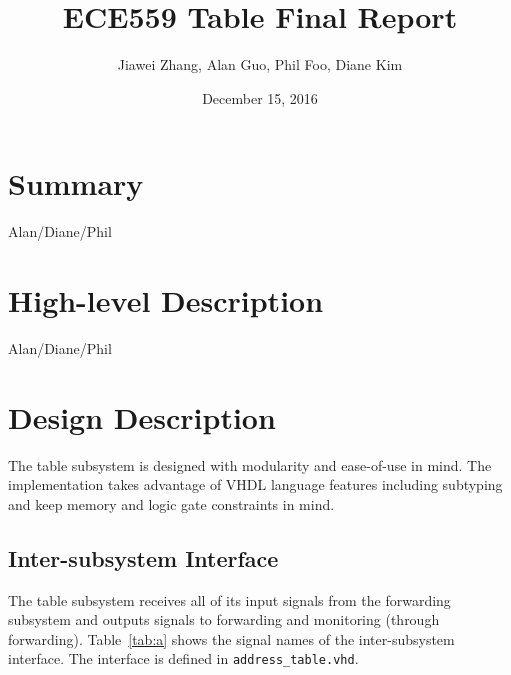 \documentclass{article}
\title{ECE559 Table Final Report}
\author{Jiawei Zhang, Alan Guo, Phil Foo, Diane Kim }
\date{December 15, 2016}
\begin{document}
\maketitle

\section{Summary}

Alan/Diane/Phil

\section{High-level Description}

Alan/Diane/Phil

\newpage

\section{Design Description}

The table subsystem is designed with modularity and ease-of-use in mind. The implementation takes advantage of VHDL language features including subtyping and keep memory and logic gate constraints in mind. 

\subsection{Inter-subsystem Interface}

The table subsystem receives all of its input signals from the forwarding subsystem and outputs signals to forwarding and monitoring (through forwarding). Table~\ref{tab:a} shows the signal names of the inter-subsystem interface. The interface is defined in \texttt{address\_table.vhd}.
\end{document}
